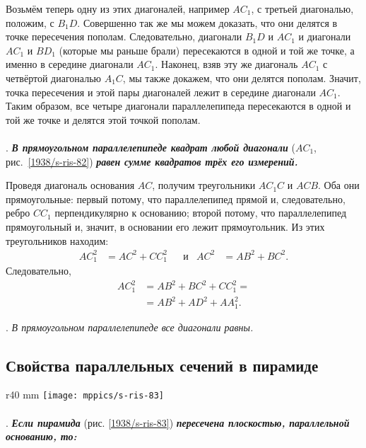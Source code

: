 Возьмём теперь одну из этих диагоналей, например $AC_1$, с третьей диагональю, положим, с $B_1D$.
Совершенно так же мы можем доказать, что они делятся в точке пересечения пополам.
Следовательно, диагонали $B_1D$ и $AC_1$ и диагонали $AC_1$ и $BD_1$ (которые мы раньше брали) пересекаются в одной и той же точке, а именно в середине диагонали $AC_1$.
Наконец, взяв эту же диагональ $AC_1$ с четвёртой диагональю $A_1C$, мы также докажем, что они делятся пополам.
Значит, точка пересечения и этой пары диагоналей лежит в середине диагонали $AC_1$.
Таким образом, все четыре диагонали параллелепипеда пересекаются в одной и той же точке и делятся этой точкой пополам.

\paragraph{}\label{1938/s73}
\mbox{.}
\textbf{\emph{В прямоугольном параллелепипеде квадрат любой диагонали}} ($AC_1$, рис.~\ref{1938/s-ris-82}) \textbf{\emph{равен сумме квадратов трёх его измерений.}}

Проведя диагональ основания $AC$, получим треугольники $AC_1C$ и $ACB$.
Оба они прямоугольные: первый потому, что параллелепипед прямой и, следовательно, ребро $CC_1$ перпендикулярно к основанию;
второй потому, что параллелепипед прямоугольный и, значит, в основании его лежит прямоугольник.
Из этих треугольников находим:
\begin{align*}
AC_1^2 &= AC^2 + CC_1^2
&&
\text{и}
&
AC^2 &= AB^2 + BC^2.
\end{align*}
Следовательно,
\begin{align*}
AC_1^2 &= AB^2 + BC^2 + CC_1^2 = 
\\
&=AB^2 + AD^2 + AA_1^2.
\end{align*}

\medskip

.
\emph{В прямоугольном параллелепипеде все диагонали равны.}

\subsection*{Свойства параллельных сечений в пирамиде}

\begin{wrapfigure}{r}{40 mm}
\vskip-0mm
\centering
\texttt{[image: mppics/s-ris-83]}
\caption{}\label{1938/s-ris-83}
\vskip-0mm
\end{wrapfigure}

\paragraph{}\label{1938/s74}
\mbox{.}
\textbf{\emph{Если пирамида}} (рис. \ref{1938/s-ris-83}) \textbf{\emph{пересечена плоскостью, параллельной основанию, то:}}

